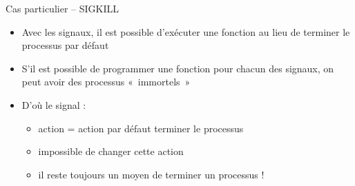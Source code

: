 \begin {frame} {Cas particulier -- SIGKILL}
    \begin {itemize}
	\item Avec les signaux, il est possible d'exécuter une fonction
	    au lieu de terminer le processus par défaut

	\item S'il est possible de programmer une fonction pour chacun
	    des signaux, on peut avoir des processus «~immortels~»

	\item D'où le signal  :

	    \begin {itemize}
		\item action = action par défaut
		    \implique terminer le processus
		\item impossible de changer cette action
		\item il reste toujours un moyen de terminer un processus !
	    \end {itemize}

    \end {itemize}
\end {frame}




